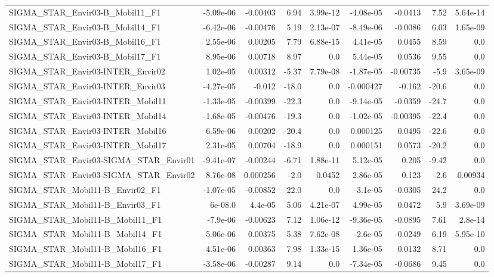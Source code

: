 \begin{tabular}{lrrrrrrrr}
SIGMA_STAR_Envir03-B_Mobil11_F1 & -5.09e-06 & -0.00403 & 6.94 & 3.99e-12 & -4.08e-05 & -0.0413 & 7.52 & 5.64e-14 \\
SIGMA_STAR_Envir03-B_Mobil14_F1 & -6.42e-06 & -0.00476 & 5.19 & 2.13e-07 & -8.49e-06 & -0.0086 & 6.03 & 1.65e-09 \\
SIGMA_STAR_Envir03-B_Mobil16_F1 & 2.55e-06 & 0.00205 & 7.79 & 6.88e-15 & 4.41e-05 & 0.0455 & 8.59 & 0.0 \\
SIGMA_STAR_Envir03-B_Mobil17_F1 & 8.95e-06 & 0.00718 & 8.97 & 0.0 & 5.44e-05 & 0.0536 & 9.55 & 0.0 \\
SIGMA_STAR_Envir03-INTER_Envir02 & 1.02e-05 & 0.00312 & -5.37 & 7.79e-08 & -1.87e-05 & -0.00735 & -5.9 & 3.65e-09 \\
SIGMA_STAR_Envir03-INTER_Envir03 & -4.27e-05 & -0.012 & -18.0 & 0.0 & -0.000427 & -0.162 & -20.6 & 0.0 \\
SIGMA_STAR_Envir03-INTER_Mobil11 & -1.33e-05 & -0.00399 & -22.3 & 0.0 & -9.14e-05 & -0.0359 & -24.7 & 0.0 \\
SIGMA_STAR_Envir03-INTER_Mobil14 & -1.68e-05 & -0.00476 & -19.3 & 0.0 & -1.02e-05 & -0.00395 & -22.4 & 0.0 \\
SIGMA_STAR_Envir03-INTER_Mobil16 & 6.59e-06 & 0.00202 & -20.4 & 0.0 & 0.000125 & 0.0495 & -22.6 & 0.0 \\
SIGMA_STAR_Envir03-INTER_Mobil17 & 2.31e-05 & 0.00704 & -18.9 & 0.0 & 0.000151 & 0.0573 & -20.2 & 0.0 \\
SIGMA_STAR_Envir03-SIGMA_STAR_Envir01 & -9.41e-07 & -0.00244 & -6.71 & 1.88e-11 & 5.12e-05 & 0.205 & -9.42 & 0.0 \\
SIGMA_STAR_Envir03-SIGMA_STAR_Envir02 & 8.76e-08 & 0.000256 & -2.0 & 0.0452 & 2.86e-05 & 0.123 & -2.6 & 0.00934 \\
SIGMA_STAR_Mobil11-B_Envir02_F1 & -1.07e-05 & -0.00852 & 22.0 & 0.0 & -3.1e-05 & -0.0305 & 24.2 & 0.0 \\
SIGMA_STAR_Mobil11-B_Envir03_F1 & 6e-08.0 & 4.4e-05 & 5.06 & 4.21e-07 & 4.99e-05 & 0.0472 & 5.9 & 3.69e-09 \\
SIGMA_STAR_Mobil11-B_Mobil11_F1 & -7.9e-06 & -0.00623 & 7.12 & 1.06e-12 & -9.36e-05 & -0.0895 & 7.61 & 2.8e-14 \\
SIGMA_STAR_Mobil11-B_Mobil14_F1 & 5.06e-06 & 0.00375 & 5.38 & 7.62e-08 & -2.6e-05 & -0.0249 & 6.19 & 5.95e-10 \\
SIGMA_STAR_Mobil11-B_Mobil16_F1 & 4.51e-06 & 0.00363 & 7.98 & 1.33e-15 & 1.36e-05 & 0.0132 & 8.71 & 0.0 \\
SIGMA_STAR_Mobil11-B_Mobil17_F1 & -3.58e-06 & -0.00287 & 9.14 & 0.0 & -7.34e-05 & -0.0686 & 9.45 & 0.0 \\

\end{tabular}
